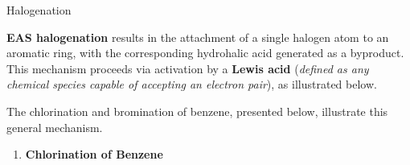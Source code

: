       \begin{core}[label=core:eas_halogenation]{Halogenation}

        \textbf{EAS halogenation} results in the attachment of a single halogen atom to an aromatic ring, with the corresponding hydrohalic acid generated as a byproduct. This mechanism proceeds via activation by a \textbf{Lewis acid} (\textit{defined as any chemical species capable of accepting an electron pair}), as illustrated below.

        \vspace{0.4cm}
        \vspace{-0.4cm}

        The chlorination and bromination of benzene, presented below, illustrate this general mechanism.

        \begin{enumerate}

          \item \textbf{Chlorination of Benzene}


\end{enumerate}
\end{core}
